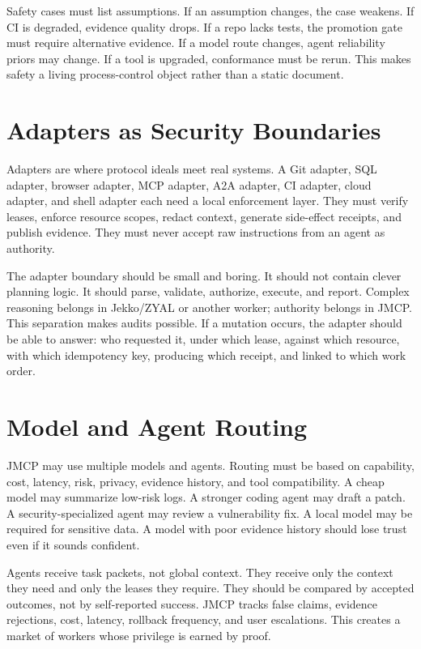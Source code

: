 \documentclass[10pt,journal,onecolumn]{IEEEtran}
\begin{document}
Safety cases must list assumptions. If an assumption changes, the case weakens. If CI is degraded, evidence quality drops. If a repo lacks tests, the promotion gate must require alternative evidence. If a model route changes, agent reliability priors may change. If a tool is upgraded, conformance must be rerun. This makes safety a living process-control object rather than a static document.

\section{Adapters as Security Boundaries}
Adapters are where protocol ideals meet real systems. A Git adapter, SQL adapter, browser adapter, MCP adapter, A2A adapter, CI adapter, cloud adapter, and shell adapter each need a local enforcement layer. They must verify leases, enforce resource scopes, redact context, generate side-effect receipts, and publish evidence. They must never accept raw instructions from an agent as authority.

The adapter boundary should be small and boring. It should not contain clever planning logic. It should parse, validate, authorize, execute, and report. Complex reasoning belongs in Jekko/ZYAL or another worker; authority belongs in JMCP. This separation makes audits possible. If a mutation occurs, the adapter should be able to answer: who requested it, under which lease, against which resource, with which idempotency key, producing which receipt, and linked to which work order.

\section{Model and Agent Routing}
JMCP may use multiple models and agents. Routing must be based on capability, cost, latency, risk, privacy, evidence history, and tool compatibility. A cheap model may summarize low-risk logs. A stronger coding agent may draft a patch. A security-specialized agent may review a vulnerability fix. A local model may be required for sensitive data. A model with poor evidence history should lose trust even if it sounds confident.

Agents receive task packets, not global context. They receive only the context they need and only the leases they require. They should be compared by accepted outcomes, not by self-reported success. JMCP tracks false claims, evidence rejections, cost, latency, rollback frequency, and user escalations. This creates a market of workers whose privilege is earned by proof.
\end{document}

